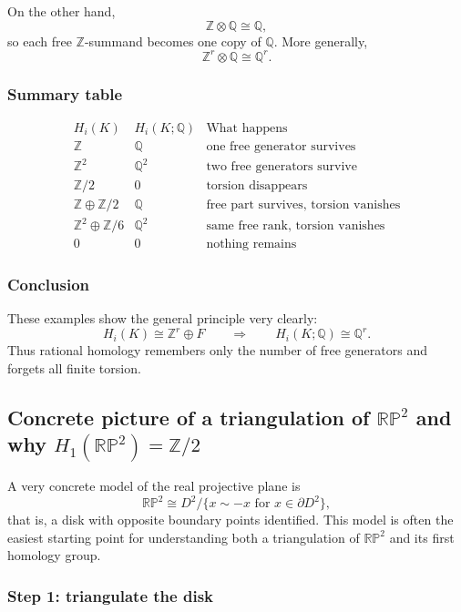 \documentclass[12pt,a4paper]{article}
\theoremstyle{notespace}
\begin{document}
On the other hand,
\[
\mathbb Z\otimes \mathbb Q\cong \mathbb Q,
\]
so each free \(\mathbb Z\)-summand becomes one copy of \(\mathbb Q\). More generally,
\[
\mathbb Z^r\otimes \mathbb Q\cong \mathbb Q^r.
\]

\subsubsection*{Summary table}

\[
\begin{array}{c|c|c}
	H_i(K) & H_i(K;\mathbb Q) & \text{What happens} \\ \hline
	\mathbb Z & \mathbb Q & \text{one free generator survives} \\
	\mathbb Z^2 & \mathbb Q^2 & \text{two free generators survive} \\
	\mathbb Z/2 & 0 & \text{torsion disappears} \\
	\mathbb Z\oplus \mathbb Z/2 & \mathbb Q & \text{free part survives, torsion vanishes} \\
	\mathbb Z^2\oplus \mathbb Z/6 & \mathbb Q^2 & \text{same free rank, torsion vanishes} \\
	0 & 0 & \text{nothing remains}
\end{array}
\]

\subsubsection*{Conclusion}

These examples show the general principle very clearly:
\[
H_i(K)\cong \mathbb Z^r\oplus F
\qquad \Longrightarrow \qquad
H_i(K;\mathbb Q)\cong \mathbb Q^r.
\]
Thus rational homology remembers only the number of free generators and forgets all finite torsion.

\subsection{Concrete picture of a triangulation of \(\mathbb{RP}^2\) and why \(H_1(\mathbb{RP}^2)=\mathbb Z/2\)}

A very concrete model of the real projective plane is
\[
\mathbb{RP}^2 \cong D^2/\{x\sim -x \text{ for }x\in \partial D^2\},
\]
that is, a disk with opposite boundary points identified. This model is often the easiest starting point for understanding both a triangulation of \(\mathbb{RP}^2\) and its first homology group.

\subsubsection*{Step 1: triangulate the disk}
\end{document}
